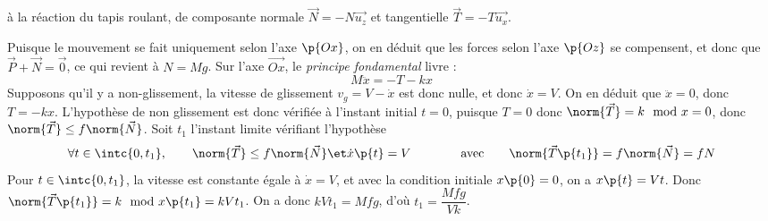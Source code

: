 \documentclass[a4paper,french,bookmarks]{article}
\begin{document}
\begin{enumerate}
{\begin{enumerate}
                \itt à la réaction du tapis roulant, de composante normale $\vec{N} = -N\vec{u_z}$ et tangentielle $\vec{T} = -T\vec{u_x}$.
            \end{enumerate}
            Puisque le mouvement se fait uniquement selon l'axe $\p{Ox}$, on en déduit que les forces selon l'axe $\p{Oz}$ se compensent, et donc que $\vec{P} + \vec{N} = \vec{0}$, ce qui revient à $N = Mg$. Sur l'axe $\vec{Ox}$, le \emph{principe fondamental} livre :
            \[ M\ddot x = -T - kx\]
            Supposons qu'il y a non-glissement, la vitesse de glissement $v_g = V - \dot x$ est donc nulle, et donc $\dot x = V$. On en déduit que $\ddot x = 0$, donc $T = -kx$. L'hypothèse de non glissement est donc vérifiée à l'instant initial $t = 0$, puisque $T = 0$ donc $\norm{\vec{T}} = k\mod{x} = 0$, donc $\norm{\vec T} \leq f\norm{\vec N}$. Soit $t_1$ l'instant limite vérifiant l'hypothèse \ie
            \[ \forall t \in \intc{0, t_1},\qquad \norm{\vec T} \leq f\norm{\vec N} \et \dot x\p{t} = V \qquad\qquad\text{avec}\qquad \norm{\vec{T}\p{t_1}} = f\norm{\vec N} = fN\]
            Pour $t \in \intc{0, t_1}$, la vitesse est constante égale à $\dot x = V$, et avec la condition initiale $x\p{0} = 0$, on a $x\p{t} = Vt$.
            Donc $\norm{\vec{T}\p{t_1}} = k\mod{x\p{t_1}} = kVt_1$. On a donc $kVt_1 = Mfg$, d'où $t_1 = \dfrac{Mfg}{Vk}$.
        }
        \nobefore
\end{enumerate}
\end{document}
